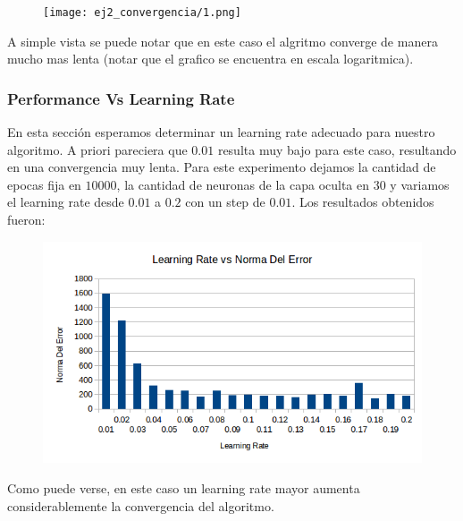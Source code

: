 \begin{figure}[h!]
  \centering
    \texttt{[image: ej2\_convergencia/1.png]}
\end{figure}

A simple vista se puede notar que en este caso el algritmo converge de manera mucho mas lenta (notar que el grafico se encuentra en escala logaritmica).

\conclucion

\subsubsection{Performance Vs Learning Rate}

En esta sección esperamos determinar un learning rate adecuado para nuestro algoritmo. A priori pareciera que $0.01$ resulta muy bajo para este caso, resultando en una convergencia muy lenta. Para este experimento dejamos la cantidad de epocas fija en $10000$, la cantidad de neuronas de la capa oculta en $30$ y variamos el learning rate desde $0.01$ a $0.2$ con un step de $0.01$. Los resultados obtenidos fueron:

\begin{figure}[h!]
  \centering
    \includegraphics[scale=0.4]{ej2_test_learning_rate/1.png}
\end{figure}

Como puede verse, en este caso un learning rate mayor aumenta considerablemente la convergencia del algoritmo.

